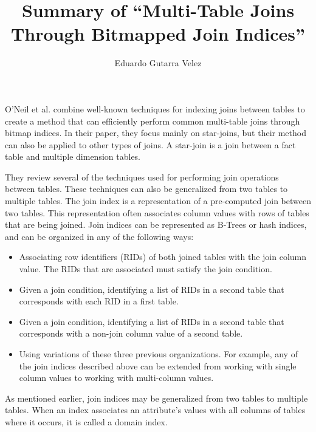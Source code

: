 \documentclass[12pt]{article}
\title{Summary of “Multi-Table Joins Through Bitmapped Join Indices”}
\author{Eduardo Gutarra Velez}
\begin{document}
\ifpdf
{}
\else
{}
\fi

\maketitle

O’Neil et al. combine well-known techniques for indexing joins between tables to create a method that can efficiently perform common multi-table joins through bitmap indices. In their paper, they focus mainly on star-joins, but their method can also be applied to other types of joins. A star-join is a join between a fact table and multiple dimension tables. 

They review several of the techniques used for performing join operations between tables. These techniques can also be
generalized from two tables to multiple tables. The join index is a representation of a pre-computed join between two tables.
This representation often associates column values with rows of tables that are being joined. Join indices can be represented
as B-Trees or hash indices, and can be organized in any of the following ways:

\begin{itemize}

	\item Associating row identifiers (RIDs) of both joined tables with the join column value. The RIDs that are associated must satisfy the join condition.

	\item Given a join condition, identifying a list of RIDs in a second table that corresponds with each RID in a first table.

	\item Given a join condition, identifying a list of RIDs in a second table that corresponds with a non-join column value of a second table.

	\item Using variations of these three previous organizations. For example, any of the join indices described above can be extended from working with single column values to working with multi-column values.

\end{itemize}

As mentioned earlier, join indices may be generalized from two tables to multiple tables. When an index associates an attribute’s values with all columns of tables where it occurs, it is called a domain index. 
\end{document}
